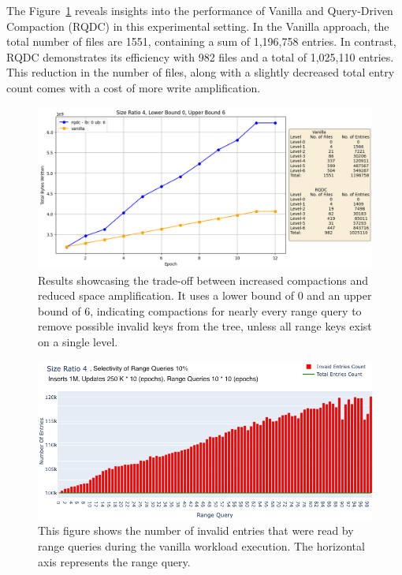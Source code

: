 The Figure~\ref{fig:epoch_experiments} reveals insights into the performance of Vanilla and Query-Driven 
Compaction (RQDC) in this experimental setting. In the Vanilla approach, the total number of files are 1551, containing 
a sum of 1,196,758 entries. In contrast, RQDC demonstrates its efficiency with 982 files and a total of 1,025,110 entries. 
This reduction in the number of files, along with a slightly decreased total entry count comes with a cost 
of more write amplification. 

\begin{figure}
    \includegraphics[scale=0.3]{Figures/epoch-experiment-size-ratio-4.png}
    \caption{Results showcasing the trade-off between increased compactions and reduced space amplification. It 
    uses a lower bound of 0 and an upper bound of 6, indicating compactions for nearly every range query to 
    remove possible invalid keys from the tree, unless all range keys exist on a single level.}\label{fig:epoch_experiments}
\end{figure}

\begin{figure}
    \includegraphics[scale=0.28]{Figures/epoch-experiment-size-ratio-4-vanilla.png}
    \caption{This figure shows the number of invalid entries that were read by range queries during the vanilla 
    workload execution. The horizontal axis represents the range query.}\label{fig:increased_invalid_keys}
\end{figure}

